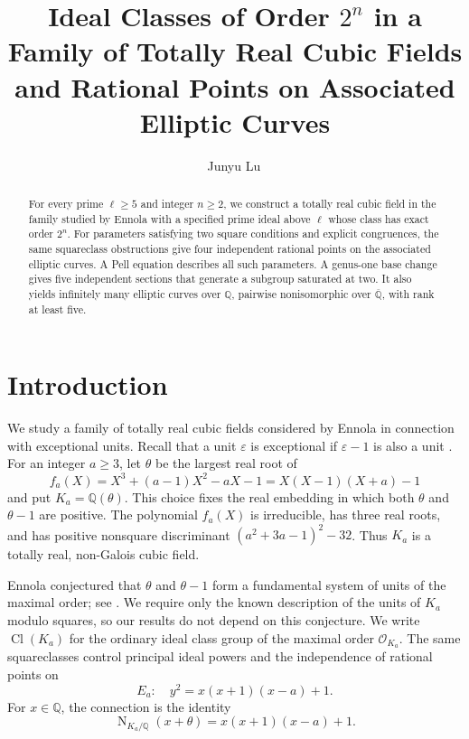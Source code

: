 \documentclass[draft]{publmathdeb}
\title[Ideal classes and rational points]{Ideal Classes of Order $2^n$ in a Family of Totally Real Cubic Fields and Rational Points on Associated Elliptic Curves}
\author[J.~Lu]{Junyu Lu\,\orcidlink{0009-0001-4973-3198}}
\date{}
\theoremstyle{remark}
\numberwithin{equation}{section}
\newcommand{\Q}{\mathbb Q}
\DeclareMathOperator{\Cl}{Cl}
\DeclareMathOperator{\Nm}{N}
\begin{document}
\begin{abstract}
  For every prime $\ell\geq5$ and integer $n\geq2$, we construct a totally real cubic field in the family studied by Ennola with a specified prime ideal above $\ell$ whose class has exact order $2^n$. For parameters satisfying two square conditions and explicit congruences, the same squareclass obstructions give four independent rational points on the associated elliptic curves. A Pell equation describes all such parameters. A genus-one base change gives five independent sections that generate a subgroup saturated at two. It also yields infinitely many elliptic curves over $\Q$, pairwise nonisomorphic over $\overline{\Q}$, with rank at least five.
\end{abstract}
\maketitle


\section{Introduction}

We study a family of totally real cubic fields considered by Ennola in connection with exceptional units. Recall that a unit $\varepsilon$ is exceptional if $\varepsilon-1$ is also a unit \cite{Ennola1991,Louboutin2017}. For an integer $a\geq3$, let $\theta$ be the largest real root of
\[
  f_a(X)=X^3+(a-1)X^2-aX-1=X(X-1)(X+a)-1
\]
and put $K_a=\Q(\theta)$. This choice fixes the real embedding in which both $\theta$ and $\theta-1$ are positive. The polynomial $f_a(X)$ is irreducible, has three real roots, and has positive nonsquare discriminant $(a^2+3a-1)^2-32$. Thus $K_a$ is a totally real, non-Galois cubic field.

Ennola conjectured that $\theta$ and $\theta-1$ form a fundamental system of units of the maximal order; see \cite{Ennola1991,Louboutin2017,ChoiKim2025}. We require only the known description of the units of $K_a$ modulo squares, so our results do not depend on this conjecture. We write $\Cl(K_a)$ for the ordinary ideal class group of the maximal order $\mathcal O_{K_a}$. The same squareclasses control principal ideal powers and the independence of rational points on
\begin{equation}\label{eq:elliptic}
  E_a:\quad y^2=x(x+1)(x-a)+1.
\end{equation}
For $x\in\Q$, the connection is the identity
\begin{equation}\label{eq:common-norm}
  \Nm_{K_a/\Q}(x+\theta)=x(x+1)(x-a)+1.
\end{equation}
\end{document}
